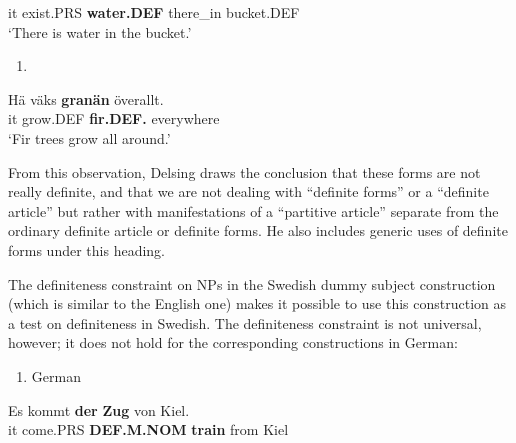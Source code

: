 it  exist.PRS  \textbf{water.DEF} there\_in  bucket.DEF\\ %


‘There is water in the bucket.’
\z


\begin{enumerate} %
\item 
\end{enumerate} %
\ea\label{}
\gll Hä  väks  \textbf{granän} överallt.\\


it  grow.DEF  \textbf{fir.DEF.} everywhere\\ %


‘Fir trees grow all around.’
\z


From this observation, Delsing draws the conclusion that these forms are not really definite, and that we are not dealing with “definite forms” or a “definite article” but rather with manifestations of a “partitive article” separate from the ordinary definite article or definite forms. He also includes generic uses of definite forms under this heading. 

The definiteness constraint on NPs in the Swedish dummy subject construction (which is similar to the English one) makes it possible to use this construction as a test on definiteness in Swedish. The definiteness constraint is not universal, however; it does not hold for the corresponding constructions in German:

\begin{enumerate} %
\item 
German

\end{enumerate} %
\ea\label{}
\gll Es  kommt  \textbf{der}\textbf{  Zug} von  Kiel.\\


it  come.PRS  \textbf{DEF.M.NOM} \textbf{train} from  Kiel\\ %


